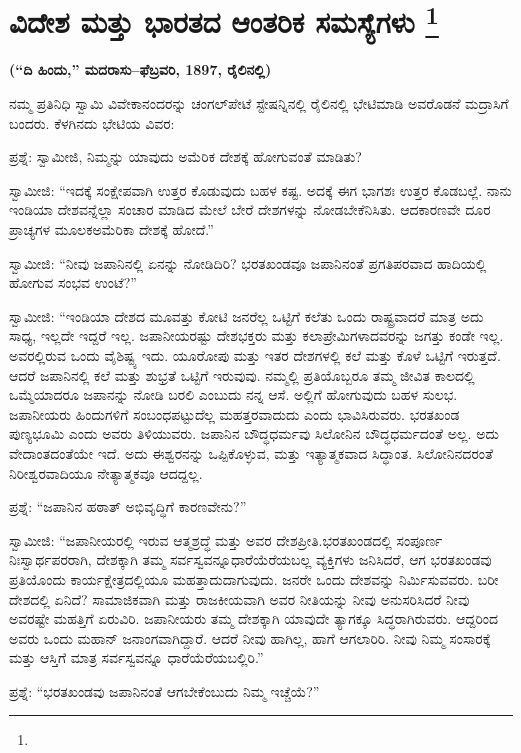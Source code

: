 
\chapter[ವಿದೇಶ ಮತ್ತು ಭಾರತದ ಆಂತರಿಕ ಸಮಸ್ಯೆಗಳು ]{ವಿದೇಶ ಮತ್ತು ಭಾರತದ ಆಂತರಿಕ ಸಮಸ್ಯೆಗಳು \protect\footnote{}}

\centerline{\textbf{(“ದಿ ಹಿಂದು,” ಮದರಾಸು–ಫೆಬ್ರವರಿ, 1897, ರೈಲಿನಲ್ಲಿ)}}

ನಮ್ಮ ಪ್ರತಿನಿಧಿ ಸ್ವಾಮಿ ವಿವೇಕಾನಂದರನ್ನು ಚಂಗಲ್​ಪೇಟೆ ಸ್ಟೇಷನ್ನಿನಲ್ಲಿ ರೈಲಿನಲ್ಲಿ ಭೇಟಿಮಾಡಿ ಅವರೊಡನೆ ಮದ್ರಾಸಿಗೆ ಬಂದರು. ಕೆಳಗಿನದು ಭೇಟಿಯ ವಿವರ:

ಪ್ರಶ್ನೆ: ಸ್ವಾಮೀಜಿ, ನಿಮ್ಮನ್ನು ಯಾವುದು ಅಮೆರಿಕ ದೇಶಕ್ಕೆ ಹೋಗುವಂತೆ ಮಾಡಿತು?

ಸ್ವಾಮೀಜಿ: “ಇದಕ್ಕೆ ಸಂಕ್ಷೇಪವಾಗಿ ಉತ್ತರ ಕೊಡುವುದು ಬಹಳ ಕಷ್ಟ. ಅದಕ್ಕೆ ಈಗ ಭಾಗಶಃ ಉತ್ತರ ಕೊಡಬಲ್ಲೆ. ನಾನು ಇಂಡಿಯಾ ದೇಶವನ್ನೆಲ್ಲಾ ಸಂಚಾರ ಮಾಡಿದ ಮೇಲೆ ಬೇರೆ ದೇಶಗಳನ್ನು ನೋಡಬೇಕೆನಿಸಿತು. ಆದಕಾರಣವೇ ದೂರ ಪ್ರಾಚ್ಯಗಳ ಮೂಲಕ\break ಅಮೆರಿಕಾ ದೇಶಕ್ಕೆ ಹೋದೆ.”

ಸ್ವಾಮೀಜಿ: “ನೀವು ಜಪಾನಿನಲ್ಲಿ ಏನನ್ನು ನೋಡಿದಿರಿ? ಭರತಖಂಡವೂ ಜಪಾನಿನಂತೆ ಪ್ರಗತಿಪರವಾದ ಹಾದಿಯಲ್ಲಿ ಹೋಗುವ ಸಂಭವ ಉಂಟೆ?”

ಸ್ವಾಮೀಜಿ: “ಇಂಡಿಯಾ ದೇಶದ ಮೂವತ್ತು ಕೋಟಿ ಜನರೆಲ್ಲ ಒಟ್ಟಿಗೆ ಕಲೆತು ಒಂದು ರಾಷ್ಟ್ರವಾದರೆ ಮಾತ್ರ ಅದು ಸಾಧ್ಯ, ಇಲ್ಲದೇ ಇದ್ದರೆ ಇಲ್ಲ. ಜಪಾನೀಯರಷ್ಟು ದೇಶಭಕ್ತರು ಮತ್ತು ಕಲಾಪ್ರೇಮಿಗಳಾದವರನ್ನು ಜಗತ್ತು ಕಂಡೇ ಇಲ್ಲ. ಅವರಲ್ಲಿರುವ ಒಂದು ವೈಶಿಷ್ಟ್ಯ ಇದು. ಯೂರೋಪು ಮತ್ತು ಇತರ ದೇಶಗಳಲ್ಲಿ ಕಲೆ ಮತ್ತು ಕೊಳೆ ಒಟ್ಟಿಗೆ ಇರುತ್ತದೆ. ಆದರೆ ಜಪಾನಿನಲ್ಲಿ ಕಲೆ ಮತ್ತು ಶುಭ್ರತೆ ಒಟ್ಟಿಗೆ ಇರುವುವು. ನಮ್ಮಲ್ಲಿ ಪ್ರತಿಯೊಬ್ಬರೂ ತಮ್ಮ ಜೀವಿತ ಕಾಲದಲ್ಲಿ ಒಮ್ಮೆಯಾದರೂ ಜಪಾನನ್ನು ನೋಡಿ ಬರಲಿ ಎಂಬುದು ನನ್ನ ಆಸೆ. ಅಲ್ಲಿಗೆ ಹೋಗುವುದು ಬಹಳ ಸುಲಭ. ಜಪಾನೀಯರು ಹಿಂದುಗಳಿಗೆ ಸಂಬಂಧಪಟ್ಟುದೆಲ್ಲ ಮಹತ್ತರವಾದುದು ಎಂದು ಭಾವಿಸಿರುವರು. ಭರತಖಂಡ ಪುಣ್ಯಭೂಮಿ ಎಂದು ಅವರು ತಿಳಿಯುವರು. ಜಪಾನಿನ ಬೌದ್ಧಧರ್ಮವು ಸಿಲೋನಿನ ಬೌದ್ಧಧರ್ಮದಂತೆ ಅಲ್ಲ. ಅದು ವೇದಾಂತದಂತೆಯೇ ಇದೆ. ಅದು ಈಶ್ವರನನ್ನು ಒಪ್ಪಿಕೊಳ್ಳುವ, ಮತ್ತು ಇತ್ಯಾತ್ಮಕವಾದ ಸಿದ್ಧಾಂತ. ಸಿಲೋನಿನದರಂತೆ ನಿರೀಶ್ವರವಾದಿಯೂ ನೇತ್ಯಾತ್ಮಕವೂ ಆದದ್ದಲ್ಲ.

ಪ್ರಶ್ನೆ: “ಜಪಾನಿನ ಹಠಾತ್​ ಅಭಿವೃದ್ಧಿಗೆ ಕಾರಣವೇನು?”

ಸ್ವಾಮೀಜಿ: “ಜಪಾನೀಯರಲ್ಲಿ ಇರುವ ಆತ್ಮಶ್ರದ್ಧೆ ಮತ್ತು ಅವರ ದೇಶಪ್ರೀತಿ.\break ಭರತಖಂಡದಲ್ಲಿ ಸಂಪೂರ್ಣ ನಿಃಸ್ವಾರ್ಥಪರರಾಗಿ, ದೇಶಕ್ಕಾಗಿ ತಮ್ಮ ಸರ್ವಸ್ವವನ್ನೂ\break ಧಾರೆಯೆರೆಯಬಲ್ಲ ವ್ಯಕ್ತಿಗಳು ಜನಿಸಿದರೆ, ಆಗ ಭರತಖಂಡವು ಪ್ರತಿಯೊಂದು ಕಾರ್ಯಕ್ಷೇತ್ರದಲ್ಲಿಯೂ ಮಹತ್ತಾದುದಾಗುವುದು. ಜನರೇ ಒಂದು ದೇಶವನ್ನು ನಿರ್ಮಿಸುವವರು. ಬರೀ ದೇಶದಲ್ಲಿ ಏನಿದೆ? ಸಾಮಾಜಿಕವಾಗಿ ಮತ್ತು ರಾಜಕೀಯವಾಗಿ ಅವರ ನೀತಿಯನ್ನು ನೀವು ಅನುಸರಿಸಿದರೆ ನೀವು ಅವರಷ್ಟೇ ಮಹತ್ತಿಗೆ ಏರುವಿರಿ. ಜಪಾನೀಯರು ತಮ್ಮ ದೇಶಕ್ಕಾಗಿ ಯಾವುದೇ ತ್ಯಾಗಕ್ಕೂ ಸಿದ್ಧರಾಗಿರುವರು. ಆದ್ದರಿಂದ ಅವರು ಒಂದು ಮಹಾನ್​ ಜನಾಂಗವಾಗಿದ್ದಾರೆ. ಆದರೆ ನೀವು ಹಾಗಿಲ್ಲ, ಹಾಗೆ ಆಗಲಾರಿರಿ. ನೀವು ನಿಮ್ಮ ಸಂಸಾರಕ್ಕೆ ಮತ್ತು ಆಸ್ತಿಗೆ ಮಾತ್ರ ಸರ್ವಸ್ವವನ್ನೂ ಧಾರೆಯೆರೆಯಬಲ್ಲಿರಿ.”

ಪ್ರಶ್ನೆ: “ಭರತಖಂಡವು ಜಪಾನಿನಂತೆ ಆಗಬೇಕೆಂಬುದು ನಿಮ್ಮ ಇಚ್ಚೆಯೆ?”

